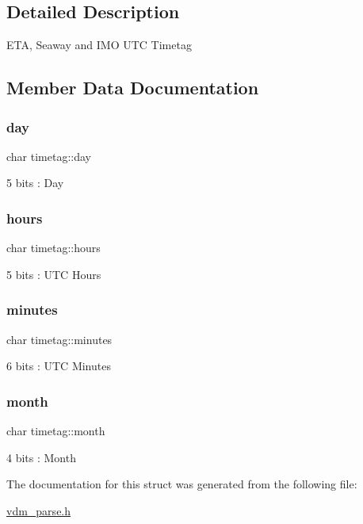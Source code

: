 \subsection{Detailed Description}
E\+TA, Seaway and I\+MO U\+TC Timetag 

\subsection{Member Data Documentation}
\mbox{\label{structtimetag_aaf31a5094e31ef71840d9da0dcd1dd9e}} 
\subsubsection{\texorpdfstring{day}{day}}
{\footnotesize\ttfamily char timetag\+::day}



5 bits \+: Day 

\mbox{\label{structtimetag_ae70ed99512e32bd65289ac909edfcf72}} 
\subsubsection{\texorpdfstring{hours}{hours}}
{\footnotesize\ttfamily char timetag\+::hours}



5 bits \+: U\+TC Hours 

\mbox{\label{structtimetag_a7fd38c7c38359d0ea51be98e655f5556}} 
\subsubsection{\texorpdfstring{minutes}{minutes}}
{\footnotesize\ttfamily char timetag\+::minutes}



6 bits \+: U\+TC Minutes 

\mbox{\label{structtimetag_a9ea92bfa06c5f8c2d1e08e536528d878}} 
\subsubsection{\texorpdfstring{month}{month}}
{\footnotesize\ttfamily char timetag\+::month}



4 bits \+: Month 



The documentation for this struct was generated from the following file\+:\begin{DoxyCompactItemize}
\item 
\mbox{\hyperlink{vdm__parse_8h}{vdm\+\_\+parse.\+h}}\end{DoxyCompactItemize}
